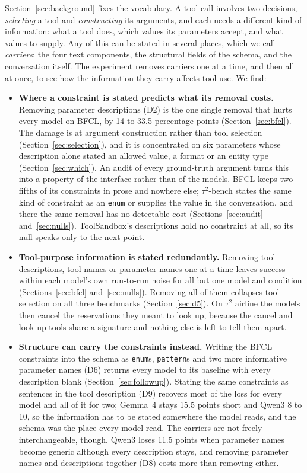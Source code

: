\documentclass[10pt]{article}
\newcommand{\code}[1]{\texttt{#1}}
\begin{document}
Section~\ref{sec:background} fixes the vocabulary. A tool call involves two decisions, \emph{selecting} a tool and \emph{constructing} its arguments, and each needs a different kind of information: what a tool does, which values its parameters accept, and what values to supply. Any of this can be stated in several places, which we call \emph{carriers}: the four text components, the structural fields of the schema, and the conversation itself. The experiment removes carriers one at a time, and then all at once, to see how the information they carry affects tool use. We find:

\begin{itemize}
  \item \textbf{Where a constraint is stated predicts what its removal costs.} Removing parameter descriptions (D2) is the one single removal that hurts every model on BFCL, by 14 to 33.5 percentage points (Section~\ref{sec:bfcl}). The damage is at argument construction rather than tool selection (Section~\ref{sec:selection}), and it is concentrated on six parameters whose description alone stated an allowed value, a format or an entity type (Section~\ref{sec:which}). An audit of every ground-truth argument turns this into a property of the interface rather than of the models. BFCL keeps two fifths of its constraints in prose and nowhere else; $\tau^2$-bench states the same kind of constraint as an \code{enum} or supplies the value in the conversation, and there the same removal has no detectable cost (Sections~\ref{sec:audit} and~\ref{sec:nulls}). ToolSandbox's descriptions hold no constraint at all, so its null speaks only to the next point.
  \item \textbf{Tool-purpose information is stated redundantly.} Removing tool descriptions, tool names or parameter names one at a time leaves success within each model's own run-to-run noise for all but one model and condition (Sections~\ref{sec:bfcl} and~\ref{sec:nulls}). Removing all of them collapses tool selection on all three benchmarks (Section~\ref{sec:d5}). On $\tau^2$ airline the models then cancel the reservations they meant to look up, because the cancel and look-up tools share a signature and nothing else is left to tell them apart.
  \item \textbf{Structure can carry the constraints instead.} Writing the BFCL constraints into the schema as \code{enum}s, \code{pattern}s and two more informative parameter names (D6) returns every model to its baseline with every description blank (Section~\ref{sec:followup}). Stating the same constraints as sentences in the tool description (D9) recovers most of the loss for every model and all of it for two; Gemma~4 stays 15.5 points short and Qwen3 8 to 10, so the information has to be stated somewhere the model reads, and the schema was the place every model read. The carriers are not freely interchangeable, though. Qwen3 loses 11.5 points when parameter names become generic although every description stays, and removing parameter names and descriptions together (D8) costs more than removing either.
\end{itemize}
\end{document}
